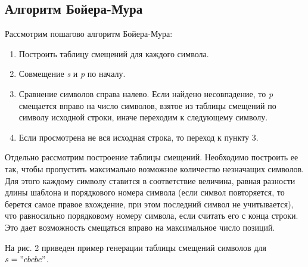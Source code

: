 \documentclass[12pt]{report}
\begin{document}
\subsection{Алгоритм Бойера-Мура}

Рассмотрим пошагово алгоритм Бойера-Мура:
\begin{enumerate}
	\item Построить таблицу смещений для каждого символа.
	\item Совмещение \textit{s} и \textit{p} по началу.
	\item Сравнение символов справа налево. Если найдено несовпадение, то \textit{p} смещается вправо на число символов, взятое из таблицы смещений по символу исходной строки, иначе переходим к следующему символу.
	\item Если просмотрена не вся исходная строка, то переход к пункту 3.
\end{enumerate}

Отдельно рассмотрим построение таблицы смещений. Необходимо построить ее так, чтобы пропустить максимально возможное количество незначащих символов. Для этого каждому символу ставится в соответствие величина, равная разности длины шаблона и порядкового номера символа (если символ повторяется, то берется самое правое вхождение, при этом последний символ не учитывается), что равносильно порядковому номеру символа, если считать его с конца строки. Это дает возможность смещаться вправо на максимальное число позиций.

На рис. 2 приведен пример генерации таблицы смещений символов для $s = "cbcbc"$.
\end{document}
